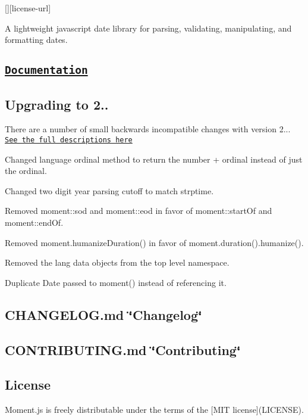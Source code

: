 \href{https://npmjs.org/package/moment}{\tt } \href{https://npmjs.org/package/moment}{\tt } \mbox{[}\mbox{]}\mbox{[}license-\/url\mbox{]} \href{http://travis-ci.org/moment/moment}{\tt }

A lightweight javascript date library for parsing, validating, manipulating, and formatting dates.

\subsection*{\href{http://momentjs.com/docs/}{\tt Documentation}}

\subsection*{Upgrading to 2..}

There are a number of small backwards incompatible changes with version 2... \href{https://gist.github.com/timrwood/e72f2eef320ed9e37c51#backwards-incompatible-changes}{\tt See the full descriptions here}


\begin{DoxyItemize}
\item Changed language ordinal method to return the number + ordinal instead of just the ordinal.
\item Changed two digit year parsing cutoff to match strptime.
\item Removed {\ttfamily moment\+::sod} and {\ttfamily moment\+::eod} in favor of {\ttfamily moment\+::start\+Of} and {\ttfamily moment\+::end\+Of}.
\item Removed {\ttfamily moment.\+humanize\+Duration()} in favor of {\ttfamily moment.\+duration().humanize()}.
\item Removed the lang data objects from the top level namespace.
\item Duplicate {\ttfamily Date} passed to {\ttfamily moment()} instead of referencing it.
\end{DoxyItemize}

\subsection*{C\+H\+A\+N\+G\+E\+L\+O\+G.\+md \char`\"{}\+Changelog\char`\"{}}

\subsection*{C\+O\+N\+T\+R\+I\+B\+U\+T\+I\+N\+G.\+md \char`\"{}\+Contributing\char`\"{}}

\subsection*{License}

Moment.\+js is freely distributable under the terms of the \mbox{[}M\+IT license\mbox{]}(L\+I\+C\+E\+N\+SE). 